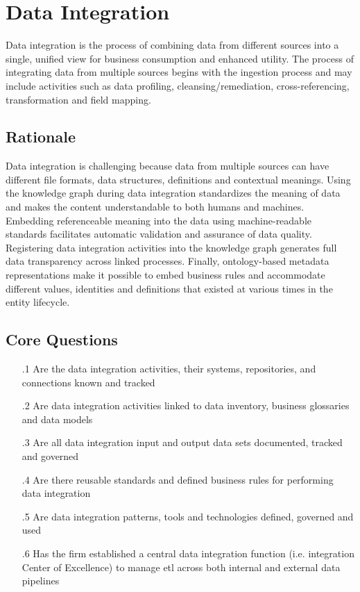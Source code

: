 \section{Data Integration}\label{subsec:b-2-5} %

Data integration is the process of combining data from different sources into a single, unified view for business consumption and enhanced utility.
The process of integrating data from multiple sources begins with the ingestion process and may include activities such as data profiling, cleansing/remediation, cross-referencing,  transformation and field mapping.

\subsection*{ Rationale}

Data integration is challenging because data from multiple sources can have different file formats, data structures, definitions and contextual meanings.
Using the knowledge graph during data integration standardizes the meaning of data and makes the content understandable to both humans and machines.
Embedding referenceable meaning into the data using machine-readable standards facilitates automatic validation and assurance of data quality.
Registering data integration activities into the knowledge graph generates full data transparency across linked processes.
Finally, ontology-based metadata representations make it possible to embed business rules and accommodate different values, identities and definitions that existed at various times in the entity lifecycle.

\subsection*{Core Questions}

\begin{itemize}[leftmargin=.5in]

  \item [\thesection.1] Are the data integration activities, their systems, repositories, and connections known and tracked
  \item [\thesection.2] Are data integration activities linked to data inventory, business glossaries and data models
  \item [\thesection.3] Are all data integration input and output data sets documented, tracked and governed
  \item [\thesection.4] Are there reusable standards and defined business rules for performing data integration
  \item [\thesection.5] Are data integration patterns, tools and technologies defined, governed and used
  \item [\thesection.6] Has the firm established a central data integration function (i.e. integration Center of Excellence) to manage \acrshort{etl} across both internal and external data pipelines

\end{itemize}
